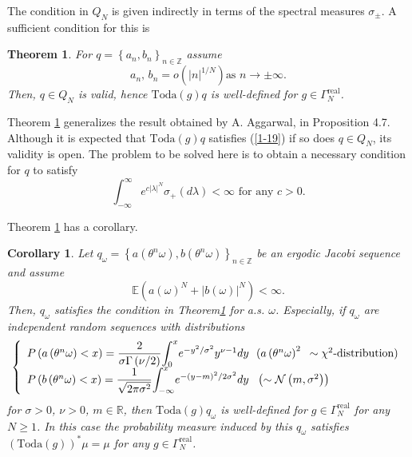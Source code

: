 \documentclass[a4paper]{article}%
\newtheorem{theorem}{Theorem}
\newtheorem{corollary}{Corollary}
\begin{document}
The condition in $Q_{N}$ is given indirectly in terms of the spectral measures
$\sigma_{\pm}$. A sufficient condition for this is

\begin{theorem}
\label{t2}For $q=\left\{  a_{n},b_{n}\right\}  _{n\in\mathbb{Z}}$ assume%
\begin{equation}
a_{n}\text{, }b_{n}=o\left(  \left\vert n\right\vert ^{1/N}\right)  \text{
\ as }n\rightarrow\pm\infty\text{.} \label{1-19}%
\end{equation}
Then, $q\in Q_{N}$ is valid, hence $\mathrm{Toda}\left(  g\right)  q$ is
well-defined for $g\in\Gamma_{N}^{\operatorname{real}}$.
\end{theorem}

Theorem \ref{t2} generalizes the result obtained by A. Aggarwal\cite{a}, in
Proposition 4.7. Although it is expected that $\mathrm{Toda}\left(  g\right)
q$ satisfies (\ref{1-19}) if so does $q\in Q_{N}$, its validity is open. The
problem to be solved here is to obtain a necessary condition for $q$ to
satisfy%
\[
\int_{-\infty}^{\infty}e^{c\left\vert \lambda\right\vert ^{N}}\sigma
_{+}\left(  d\lambda\right)  <\infty\text{ for any }c>0\text{.}%
\]


Theorem \ref{t2} has a corollary.

\begin{corollary}
\label{c1}Let $q_{\omega}=\left\{  a\left(  \theta^{n}\omega\right)  ,b\left(
\theta^{n}\omega\right)  \right\}  _{n\in\mathbb{Z}}$ be an ergodic Jacobi
sequence and assume%
\begin{equation}
\mathbb{E}\left(  a\left(  \omega\right)  ^{N}+\left\vert b\left(
\omega\right)  \right\vert ^{N}\right)  <\infty\text{.} \label{1-20}%
\end{equation}
Then, $q_{\omega}$ satisfies the condition in Theorem\ref{t2} for a.s.
$\omega$. Especially, if $q_{\omega}$ are independent random sequences with
distributions%
\[
\left\{
\begin{array}
[c]{l}%
P\left(  a\left(  \theta^{n}\omega\right)  <x\right)  =\dfrac{2}{\sigma
\Gamma\left(  \nu/2\right)  }%
{\displaystyle\int_{0}^{x}}
e^{-y^{2}/\sigma^{2}}y^{\nu-1}dy\text{ \ }(a\left(  \theta^{n}\omega\right)
^{2}\text{ }\sim\chi^{2}\text{-distribution})\\
P\left(  b\left(  \theta^{n}\omega\right)  <x\right)  =\dfrac{1}{\sqrt
{2\pi\sigma^{2}}}%
{\displaystyle\int_{-\infty}^{x}}
e^{-\left(  y-m\right)  ^{2}/2\sigma^{2}}dy\text{ \ }\left(  \sim
\mathcal{N}\left(  m,\sigma^{2}\right)  \right)
\end{array}
\right.
\]
for $\sigma>0$, $\nu>0$, $m\in\mathbb{R}$, then $\mathrm{Toda}\left(
g\right)  q_{\omega}$ is well-defined for $g\in\Gamma_{N}^{\operatorname{real}%
}$ for any $N\geq1$. In this case the probability measure induced by this
$q_{\omega}$ satisfies $\left(  \mathrm{Toda}\left(  g\right)  \right)
^{\ast}\mu=\mu$ for any $g\in\Gamma_{N}^{\operatorname{real}}$.
\end{corollary}
\end{document}
